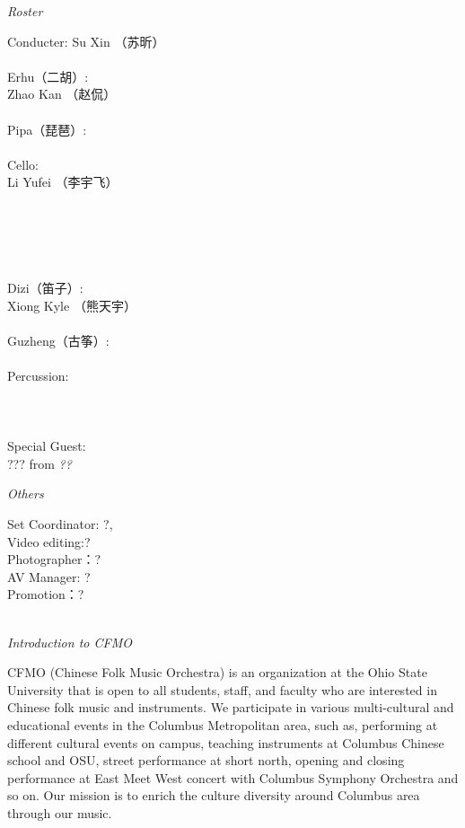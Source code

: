 \documentclass[letter,6pt,poets]{ConcProg}
\begin{document}
\begin{spacing}{1.0}
\begin{center}
\Large\textsl{ Roster}
\end{center}
\begin{multicols}{2}%
Conducter: Su Xin  （苏昕）
\\
\\
 Erhu（二胡）:     \\     
Zhao Kan （赵侃）\\
\\
Pipa（琵琶）:\\
\\
Cello:\\
Li Yufei （李宇飞）\\
\\
\\
\\
\\
\\
Dizi（笛子）: 				 \\
Xiong Kyle （熊天宇）\\
\\
Guzheng（{古筝}）:\\
\\
Percussion:\\
\\
\\
\\
Special Guest:\\
??? 
 \footnotesize{ from } \emph{ ??}
\\
\end{multicols}
\begin{center}
\Large\textsl{ Others}
\end{center}
\begin{multicols}{2}%
 Set Coordinator: ?,\\ 
 Video editing:? \\
Photographer：?\\
AV Manager: ?\\
Promotion：?\\
\\


\end{multicols}
\begin{center}
\Large\textsl{ Introduction to CFMO}
\end{center}

CFMO (Chinese Folk Music Orchestra) is an organization at the Ohio State University that is open to all students, staff, and faculty who are interested in Chinese folk music and instruments. We participate in various multi-cultural and educational events in the Columbus Metropolitan area, such as, performing at different cultural events on campus, teaching instruments at Columbus Chinese school and OSU, street performance at short north, opening and closing performance at East Meet West concert with Columbus Symphony Orchestra and so on. Our mission is to enrich the culture diversity around Columbus area through our music.
\end{spacing}
\end{document}
